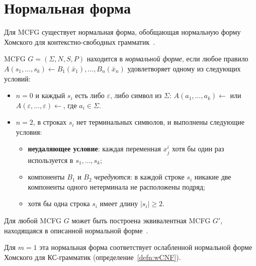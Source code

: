 \section{Нормальная форма}

Для MCFG существует нормальная форма, обобщающая нормальную форму Хомского для контекстно-свободных грамматик~.

\begin{definition}
    MCFG $G = (\Sigma, N, S, P)$ находится в \emph{нормальной форме},
    если любое правило $A(s_1,\ldots,s_k) \leftarrow B_1(\bar x_1),\ldots,B_n(\bar x_n)$
    удовлетворяет одному из следующих условий:
    \begin{itemize}
        \item $n = 0$ и каждый $s_i$ есть либо $\varepsilon$, либо символ из $\Sigma$:
              $A(a_1,\ldots,a_k) \leftarrow$ или $A(\varepsilon,\ldots,\varepsilon) \leftarrow$,
              где $a_i \in \Sigma$.
        \item $n = 2$, в строках $s_i$ нет терминальных символов,
              и выполнены следующие условия:
              \begin{itemize}
                  \item \textbf{неудаляющее условие}: каждая переменная $x^i_j$
                        хотя бы один раз используется в $s_1,\ldots,s_k$;
                  \item компоненты $B_1$ и $B_2$ \emph{чередуются}: в каждой строке $s_i$
                        никакие две компоненты одного нетерминала не расположены подряд;
                  \item хотя бы одна строка $s_i$ имеет длину $|s_i| \ge 2$.
              \end{itemize}
    \end{itemize}
\end{definition}

\begin{theorem}\label{thm:mcfg_normal_form}
    Для любой MCFG $G$ может быть построена эквивалентная MCFG $G'$,
    находящаяся в описанной нормальной форме~.
\end{theorem}

Для $m = 1$ эта нормальная форма соответствует ослабленной нормальной форме Хомского для КС-грамматик (определение~\ref{defn:wCNF}).

